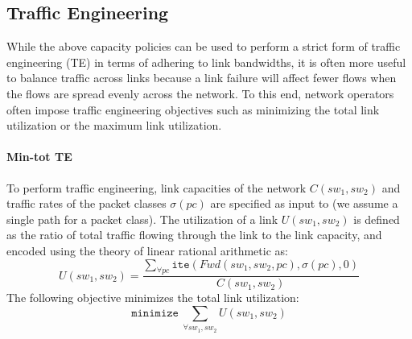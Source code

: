 \subsection{Traffic Engineering}
While the above capacity policies can be used to perform a strict form
of traffic engineering (TE) in terms of adhering to link bandwidths,
it is often more useful to balance traffic across links because a
link failure will affect fewer flows when the flows are spread evenly
across the network.  To this end, network operators often impose
traffic engineering objectives such as minimizing the total link
utilization or the maximum link utilization. 

\paragraph{Min-tot TE}
To perform traffic engineering, link capacities of the network $C(sw_1, sw_2)$ and traffic 
rates of the packet classes $\sigma(pc)$ are specified as input to \name (we assume a single
path for a packet class). The utilization 
of a link $U(sw_1, sw_2)$ is defined as the ratio of total traffic flowing through the link to the 
link capacity, and encoded using the theory of linear rational arithmetic as:
\begin{equation}
U(sw_1, sw_2) = \frac{\sum_{\forall pc} \texttt{ite}(Fwd(sw_1,sw_2, pc), \sigma(pc), 0)} {C(sw_1, sw_2)}
\end{equation}
The following objective minimizes the total link utilization:
\begin{equation}
	\texttt{minimize}\ \sum_{\forall sw_1, sw_2} U(sw_1, sw_2)
\end{equation}
